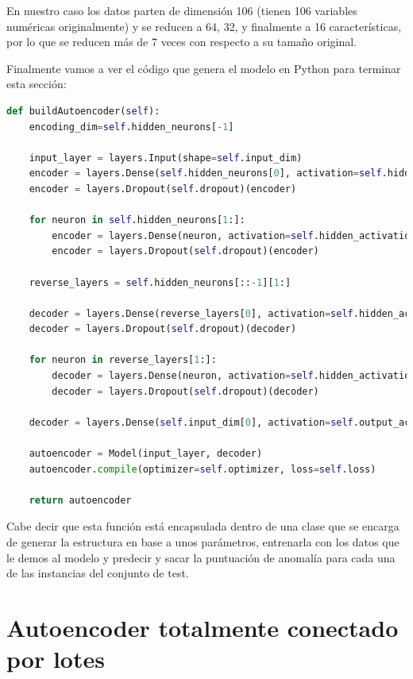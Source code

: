 En nuestro caso los datos parten de dimensión 106 (tienen 106 variables numéricas originalmente) y se reducen a 64, 32, y finalmente a 16 características, por lo que se reducen más de 7 veces con respecto a su tamaño original.

Finalmente vamos a ver el código que genera el modelo en Python para terminar esta sección:

\begin{lstlisting}[language=Python]
def buildAutoencoder(self):	
	encoding_dim=self.hidden_neurons[-1]
	
	input_layer = layers.Input(shape=self.input_dim)
	encoder = layers.Dense(self.hidden_neurons[0], activation=self.hidden_activation, activity_regularizer = l2(self.l2_regularizer))(input_layer)
	encoder = layers.Dropout(self.dropout)(encoder)
	
	for neuron in self.hidden_neurons[1:]:
		encoder = layers.Dense(neuron, activation=self.hidden_activation, activity_regularizer = l2(self.l2_regularizer))(encoder)
		encoder = layers.Dropout(self.dropout)(encoder)
	
	reverse_layers = self.hidden_neurons[::-1][1:]
	
	decoder = layers.Dense(reverse_layers[0], activation=self.hidden_activation, activity_regularizer = l2(self.l2_regularizer))(encoder)
	decoder = layers.Dropout(self.dropout)(decoder)
	
	for neuron in reverse_layers[1:]:
		decoder = layers.Dense(neuron, activation=self.hidden_activation, activity_regularizer = l2(self.l2_regularizer))(decoder)
		decoder = layers.Dropout(self.dropout)(decoder)
	
	decoder = layers.Dense(self.input_dim[0], activation=self.output_activation, activity_regularizer = l2(self.l2_regularizer))(decoder)
	
	autoencoder = Model(input_layer, decoder)
	autoencoder.compile(optimizer=self.optimizer, loss=self.loss)
	
	return autoencoder
\end{lstlisting}

Cabe decir que esta función está encapsulada dentro de una clase que se encarga de generar la estructura en base a unos parámetros, entrenarla con los datos que le demos al modelo y predecir y sacar la puntuación de anomalía para cada una de las instancias del conjunto de test.

\section{Autoencoder totalmente conectado por lotes}


